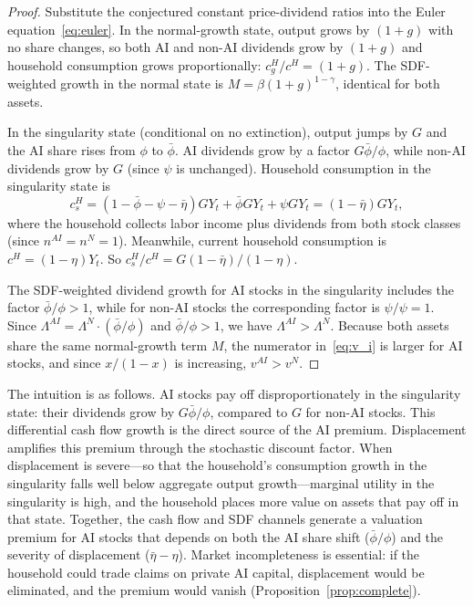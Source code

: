 \documentclass[12pt]{article}
\begin{document}
\begin{proof}
Substitute the conjectured constant price-dividend ratios into the Euler equation~\eqref{eq:euler}. In the normal-growth state, output grows by $(1+g)$ with no share changes, so both AI and non-AI dividends grow by $(1+g)$ and household consumption grows proportionally: $c_g^H / c^H = (1+g)$. The SDF-weighted growth in the normal state is $M = \beta(1+g)^{1-\gamma}$, identical for both assets.

In the singularity state (conditional on no extinction), output jumps by $G$ and the AI share rises from $\phi$ to $\bar{\phi}$. AI dividends grow by a factor $G \bar{\phi}/\phi$, while non-AI dividends grow by $G$ (since $\psi$ is unchanged). Household consumption in the singularity state is
\[
c_s^H = \left(1 - \bar{\phi} - \psi - \bar{\eta}\right) G Y_t + \bar{\phi} G Y_t + \psi G Y_t = (1 - \bar{\eta}) G Y_t,
\]
where the household collects labor income plus dividends from both stock classes (since $n^{AI} = n^N = 1$). Meanwhile, current household consumption is $c^H = (1 - \eta) Y_t$. So $c_s^H / c^H = G(1-\bar{\eta})/(1-\eta)$.

The SDF-weighted dividend growth for AI stocks in the singularity includes the factor $\bar{\phi}/\phi > 1$, while for non-AI stocks the corresponding factor is $\psi/\psi = 1$. Since $\Lambda^{AI} = \Lambda^N \cdot (\bar{\phi}/\phi)$ and $\bar{\phi}/\phi > 1$, we have $\Lambda^{AI} > \Lambda^N$. Because both assets share the same normal-growth term $M$, the numerator in~\eqref{eq:v_i} is larger for AI stocks, and since $x/(1-x)$ is increasing, $v^{AI} > v^{N}$.
\end{proof}

The intuition is as follows. AI stocks pay off disproportionately in the singularity state: their dividends grow by $G\bar{\phi}/\phi$, compared to $G$ for non-AI stocks. This differential cash flow growth is the direct source of the AI premium. Displacement amplifies this premium through the stochastic discount factor. When displacement is severe---so that the household's consumption growth in the singularity falls well below aggregate output growth---marginal utility in the singularity is high, and the household places more value on assets that pay off in that state. Together, the cash flow and SDF channels generate a valuation premium for AI stocks that depends on both the AI share shift ($\bar{\phi}/\phi$) and the severity of displacement ($\bar{\eta} - \eta$). Market incompleteness is essential: if the household could trade claims on private AI capital, displacement would be eliminated, and the premium would vanish (Proposition~\ref{prop:complete}).
\end{document}
